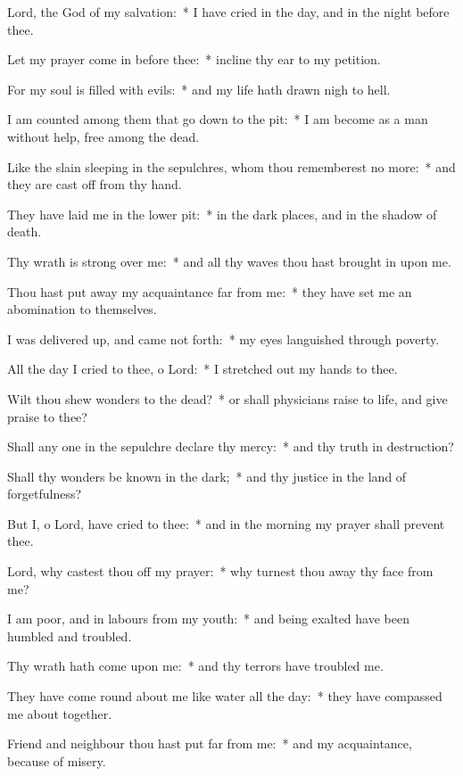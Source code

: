 \begin{enpars}
\item Lord, the God of my salvation:~* I have cried in the day, and in the night before thee.
\item Let my prayer come in before thee:~* incline thy ear to my petition.
\item For my soul is filled with evils:~* and my life hath drawn nigh to hell.
\item I am counted among them that go down to the pit:~* I am become as a man without help, free among the dead.
\item Like the slain sleeping in the sepulchres, whom thou rememberest no more:~* and they are cast off from thy hand.
\item They have laid me in the lower pit:~* in the dark places, and in the shadow of death.
\item Thy wrath is strong over me:~* and all thy waves thou hast brought in upon me.
\item Thou hast put away my acquaintance far from me:~* they have set me an abomination to themselves.
\item I was delivered up, and came not forth:~* my eyes languished through poverty.
\item All the day I cried to thee, o Lord:~* I stretched out my hands to thee.
\item Wilt thou shew wonders to the dead?~* or shall physicians raise to life, and give praise to thee?
\item Shall any one in the sepulchre declare thy mercy:~* and thy truth in destruction?
\item Shall thy wonders be known in the dark;~* and thy justice in the land of forgetfulness?
\item But I, o Lord, have cried to thee:~* and in the morning my prayer shall prevent thee.
\item Lord, why castest thou off my prayer:~* why turnest thou away thy face from me?
\item I am poor, and in labours from my youth:~* and being exalted have been humbled and troubled.
\item Thy wrath hath come upon me:~* and thy terrors have troubled me.
\item They have come round about me like water all the day:~* they have compassed me about together.
\item Friend and neighbour thou hast put far from me:~* and my acquaintance, because of misery.
\end{enpars}